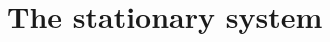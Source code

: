 \documentclass[11pt,reqno]{amsart}
\theoremstyle{remark}
\def\n{\textbf{\textit{n}}}
\def\d{{\rm d}}
\def\div{\mathrm{div}}
\numberwithin{equation}{section}
\def\d{{\rm d}}
\begin{document}

\section{The stationary system}
\label{s-stationary}
\end{document}

